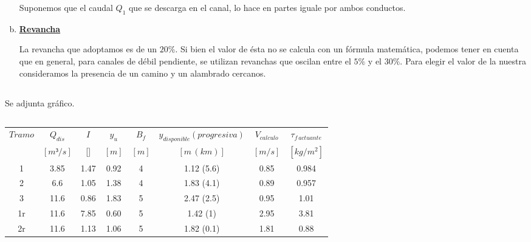 \documentclass[10.5pt]{article}
\begin{document}
\begin{enumerate}[a)]
 Suponemos que el caudal $Q_1$ que se descarga en el canal, lo hace en partes iguale por ambos conductos.
 
 
 
 \item \underline{\bf Revancha}
   
  La revancha que adoptamos es de un $20\%$. Si bien el valor de ésta no se calcula con un fórmula matemática, podemos tener en cuenta que 
  en general, para canales de débil pendiente, se utilizan revanchas que oscilan entre el $5\%$ y el $30\%$. Para elegir el valor de la nuestra
  consideramos la presencia de un camino y un alambrado cercanos.
\end{enumerate}
  
\subsection{}

Se adjunta gráfico.

\subsection{}
 
   \begin{table}[H]
    \large        %
    \centering    %
    \begin{tabular}{|c|c|c|c|c|c|c|c|}
    \hline
    $Tramo$  	&$Q_{dis}$  	&$I$  			&$y_{u}$	&$B_{f}$	&$y_{disponible} (progresiva)$  	&$V_{calculo}$  &$\tau_{f\,actuante}$ \\     %
		&$[m³/s]$  	&[\textperthousand] 	&$[m]$		&$[m]$		&$[m\,(km)]$  				&$[m/s]$	&$[kg/m^2]$ \\     %
    \hline
    1		&3.85			&1.47	&0.92	  &4		&1.12 (5.6)			&0.85		&0.984\\
    \hline
    2		&6.6			&1.05	&1.38	  &4		&1.83 (4.1)			&0.89		&0.957\\
    \hline
    3		&11.6			&0.86	&1.83	  &5		&2.47 (2.5)			&0.95		&1.01\\
    \hline
    1r		&11.6			&7.85	&0.60	  &5		&1.42 (1)			&2.95		&3.81\\
    \hline
    2r		&11.6	&1.13	&1.06	  &5	&1.82 (0.1)	&1.81	&0.88\\
    \hline        %
    \end{tabular}
  \end{table}



























 
\end{document}
